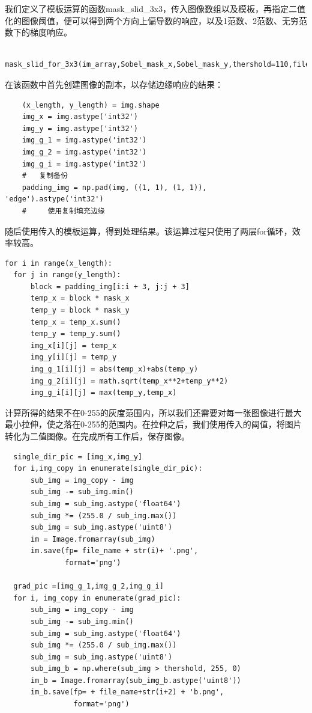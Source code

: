 \documentclass[a4paper,11pt,UTF8]{ctexart}
\begin{document}
我们定义了模板运算的函数mask\_slid\_3x3，传入图像数组以及模板，再指定二值化的图像阈值，便可以得到两个方向上偏导数的响应，以及1范数、2范数、无穷范数下的梯度响应。

\begin{lstlisting}
  mask_slid_for_3x3(im_array,Sobel_mask_x,Sobel_mask_y,thershold=110,file_name='sky_sobel_110_')
\end{lstlisting}

在该函数中首先创建图像的副本，以存储边缘响应的结果：
\begin{lstlisting}
    (x_length, y_length) = img.shape
    img_x = img.astype('int32')
    img_y = img.astype('int32')
    img_g_1 = img.astype('int32')
    img_g_2 = img.astype('int32')
    img_g_i = img.astype('int32')
    #   复制备份
    padding_img = np.pad(img, ((1, 1), (1, 1)), 'edge').astype('int32')
    #     使用复制填充边缘
\end{lstlisting}

随后使用传入的模板运算，得到处理结果。该运算过程只使用了两层for循环，效率较高。
\begin{lstlisting}
for i in range(x_length):
  for j in range(y_length):
      block = padding_img[i:i + 3, j:j + 3]
      temp_x = block * mask_x
      temp_y = block * mask_y
      temp_x = temp_x.sum()
      temp_y = temp_y.sum()
      img_x[i][j] = temp_x
      img_y[i][j] = temp_y
      img_g_1[i][j] = abs(temp_x)+abs(temp_y)
      img_g_2[i][j] = math.sqrt(temp_x**2+temp_y**2)
      img_g_i[i][j] = max(temp_y,temp_x)
\end{lstlisting}

计算所得的结果不在0-255的灰度范围内，所以我们还需要对每一张图像进行最大最小拉伸，使之落在0-255的范围内。在拉伸之后，我们使用传入的阈值，将图片转化为二值图像。在完成所有工作后，保存图像。
\begin{lstlisting}
  single_dir_pic = [img_x,img_y]
  for i,img_copy in enumerate(single_dir_pic):
      sub_img = img_copy - img
      sub_img -= sub_img.min()
      sub_img = sub_img.astype('float64')
      sub_img *= (255.0 / sub_img.max())
      sub_img = sub_img.astype('uint8')
      im = Image.fromarray(sub_img)
      im.save(fp= file_name + str(i)+ '.png',
              format='png')

  grad_pic =[img_g_1,img_g_2,img_g_i]
  for i, img_copy in enumerate(grad_pic):
      sub_img = img_copy - img
      sub_img -= sub_img.min()
      sub_img = sub_img.astype('float64')
      sub_img *= (255.0 / sub_img.max())
      sub_img = sub_img.astype('uint8')
      sub_img_b = np.where(sub_img > thershold, 255, 0)
      im_b = Image.fromarray(sub_img_b.astype('uint8'))
      im_b.save(fp= + file_name+str(i+2) + 'b.png',
                format='png')
\end{lstlisting}
\end{document}
